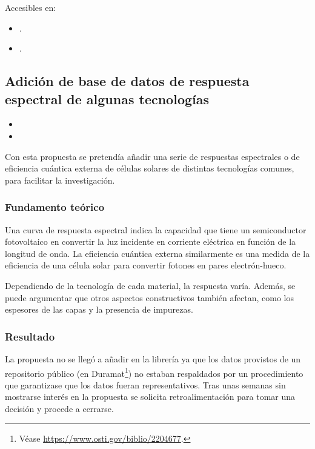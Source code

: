 Accesibles en:

\begin{itemize}
    \item {}.
    \item {}.
\end{itemize}

\subsection{Adición de base de datos de respuesta espectral de algunas tecnologías}

\begin{itemize}
    \item {}
    \item {}
\end{itemize}

Con esta propuesta se pretendía añadir una serie de respuestas espectrales o de \gls{eficiencia cuántica externa} de células solares de distintas tecnologías comunes, para facilitar la investigación.

\subsubsection{Fundamento teórico}

Una curva de \gls{respuesta espectral} indica la capacidad que tiene un \gls{semiconductor} fotovoltaico en convertir la luz incidente en corriente eléctrica en función de la \gls{longitud de onda}. La eficiencia cuántica externa similarmente es una medida de la eficiencia de una célula solar para convertir fotones en pares electrón-hueco.

Dependiendo de la tecnología de cada material, la respuesta varía. Además, se puede argumentar que otros aspectos constructivos también afectan, como los espesores de las capas y la presencia de impurezas.

\subsubsection{Resultado}

La propuesta no se llegó a añadir en la librería ya que los datos provistos de un repositorio público (en Duramat\footnote{Véase \url{https://www.osti.gov/biblio/2204677}.}) no estaban respaldados por un procedimiento que garantizase que los datos fueran representativos. Tras unas semanas sin mostrarse interés en la propuesta se solicita retroalimentación para tomar una decisión y procede a cerrarse.

